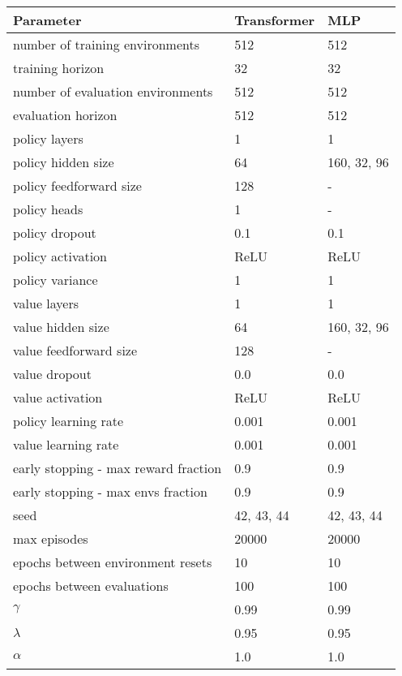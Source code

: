 \begin{tabular}{ l l l}
	\toprule
	Parameter & Transformer & MLP \\
	\midrule
	number of training environments & 512 & 512 \\
	training horizon & 32 & 32 \\
	number of evaluation environments & 512 & 512 \\
	evaluation horizon & 512 & 512 \\
	policy layers & 1 & 1 \\
	policy hidden size & 64 & {160, 32, 96} \\
	policy feedforward size & 128 & - \\
	policy heads & 1 & - \\
	policy dropout & 0.1 & 0.1 \\
	policy activation & ReLU & ReLU \\
	policy variance & 1 & 1 \\
	value layers & 1 & 1 \\
	value hidden size & 64 & {160, 32, 96} \\
	value feedforward size & 128 & - \\
	value dropout & 0.0 & 0.0 \\
	value activation & ReLU & ReLU \\
	policy learning rate & 0.001 & 0.001 \\
	value learning rate & 0.001 & 0.001 \\
	early stopping - max reward fraction & 0.9 & 0.9 \\
	early stopping - max envs fraction & 0.9 & 0.9 \\
	seed & {42, 43, 44} & {42, 43, 44} \\
	max episodes & 20000 & 20000 \\
	epochs between environment resets & 10 & 10 \\
	epochs between evaluations & 100 & 100 \\
	$\gamma$ & 0.99 & 0.99 \\
	$\lambda$ & 0.95 & 0.95 \\
	$\alpha$ & 1.0 & 1.0 \\
	\bottomrule
\end{tabular}
